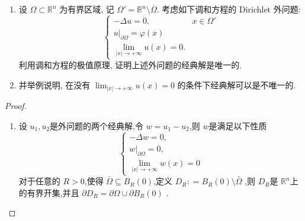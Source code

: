 \documentclass[../../main.tex]{subfiles}
\begin{document}
\begin{problemsec}




    \begin{problem}
\begin{enumerate}
    \item 设 $\Omega \subset \mathbb{R}^n$ 为有界区域, 记 $\Omega' = \mathbb{R}^n \setminus \overline{\Omega}$. 考虑如下调和方程的 Dirichlet 外问题:
    \[ \begin{cases} -\Delta u = 0, & x \in \Omega' \\ u|_{\partial \Omega} = \varphi(x) \\ \lim_{|x| \to +\infty} u(x) = 0. \end{cases} \]
    利用调和方程的极值原理, 证明上述外问题的经典解是唯一的.
    \item 并举例说明, 在没有 $\lim_{|x| \to +\infty} u(x) = 0$ 的条件下经典解可以是不唯一的.

\end{enumerate}
\end{problem}

\begin{proof}
    \begin{enumerate}
        \item 设 \(  u_1,u_2  \)是外问题的两个经典解,令 \(  w= u_1-u_2  \),则 \(  w  \)是满足以下性质 \[
        \begin{cases} - \Delta w= 0,\\ 
         w|_{ \partial  \Omega }=0,\\ 
          \lim_{\left| x \right|\to + \infty }w\left( x \right)= 0   \end{cases} 
        \]   对于任意的 \(  R> 0  \),使得 \(   \bar{\Omega}\subseteq B_{R}\left( 0 \right)   \),定义 \(  D_{R}: =  B_{R}\left( 0 \right)\setminus  \bar{\Omega}   \)  ,则 \(  D_{R}  \)是 \(  \mathbb{R} ^{n}  \)上的有界开集,并且  \(   \partial D_{R}=  \partial  \Omega \cup   \partial B_{R}\left( 0 \right)   \)   . 
        

\end{enumerate}
\end{proof}
\end{problemsec}
\end{document}
